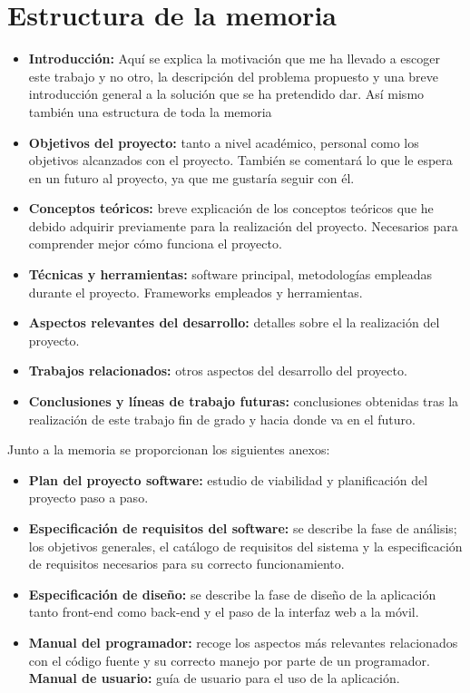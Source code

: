 \section{Estructura de la memoria}\label{estructura-de-la-memoria}

\begin{itemize}
\tightlist
\item
  \textbf{Introducción:} Aquí se explica la motivación que me ha llevado a escoger este trabajo y no otro, la descripción del problema propuesto y una breve introducción general a la solución que se ha pretendido dar. Así mismo también una estructura de toda la memoria 
\item
  \textbf{Objetivos del proyecto:} tanto a nivel académico, personal como los objetivos alcanzados con el proyecto. También se comentará lo que le espera en un futuro al proyecto, ya que me gustaría seguir con él.
\item
  \textbf{Conceptos teóricos:} breve explicación de los conceptos
  teóricos que he debido adquirir previamente para la realización del proyecto. Necesarios para comprender mejor cómo funciona el proyecto.
\item
  \textbf{Técnicas y herramientas:} software principal, metodologías empleadas durante el proyecto. Frameworks empleados y herramientas.
\item
  \textbf{Aspectos relevantes del desarrollo:} detalles sobre el la realización del proyecto.
\item
  \textbf{Trabajos relacionados:} otros aspectos del desarrollo del proyecto.
\item
  \textbf{Conclusiones y líneas de trabajo futuras:} conclusiones
  obtenidas tras la realización de este trabajo fin de grado y hacia donde va en el futuro.
\end{itemize}

Junto a la memoria se proporcionan los siguientes anexos:

\begin{itemize}
\tightlist
\item
  \textbf{Plan del proyecto software:} estudio de viabilidad y planificación del proyecto paso a paso.
\item
  \textbf{Especificación de requisitos del software:} se describe la
  fase de análisis; los objetivos generales, el catálogo de requisitos
  del sistema y la especificación de requisitos necesarios para su correcto funcionamiento.
\item
  \textbf{Especificación de diseño:} se describe la fase de diseño de la aplicación tanto front-end como back-end y el paso de la interfaz web a la móvil.
\item
  \textbf{Manual del programador:} recoge los aspectos más relevantes
  relacionados con el código fuente y su correcto manejo por parte de un programador.
  \textbf{Manual de usuario:} guía de usuario para el uso de la aplicación.
\end{itemize}

